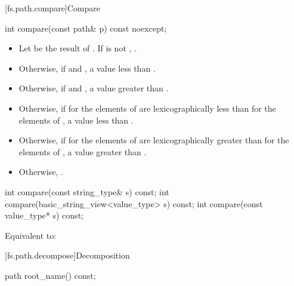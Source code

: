[fs.path.compare]{Compare}

%
\begin{itemdecl}
int compare(const path& p) const noexcept;
\end{itemdecl}

\begin{itemdescr}
\pnum
\returns
\begin{itemize}
\item
  Let  be the result of
  .
  If  is not ,
  .
\item
  Otherwise, if
   and ,
  a value less than .
\item
  Otherwise, if
   and ,
  a value greater than .
\item
  Otherwise, if
   for the elements of 
  are lexicographically less than
   for the elements of ,
  a value less than .
\item
  Otherwise, if
   for the elements of 
  are lexicographically greater than
   for the elements of ,
  a value greater than .
\item
  Otherwise, .
\end{itemize}
\end{itemdescr}

%
\begin{itemdecl}
int compare(const string_type& s) const;
int compare(basic_string_view<value_type> s) const;
int compare(const value_type* s) const;
\end{itemdecl}

\begin{itemdescr}
\pnum
\effects
Equivalent to: 
\end{itemdescr}

[fs.path.decompose]{Decomposition}

%
\begin{itemdecl}
path root_name() const;
\end{itemdecl}

